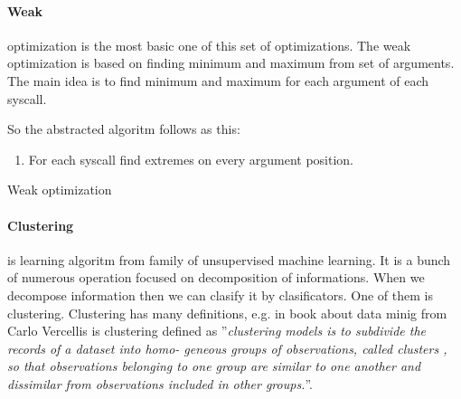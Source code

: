 	\paragraph{Weak}
	optimization is the most basic one of this set of optimizations.
	The weak optimization is based on finding minimum and maximum from set of arguments.
	The main idea is to find minimum and maximum for each argument of each syscall.

	So the abstracted algoritm follows as this:
	\begin{enumerate}
		\item For each syscall find extremes on every argument position.
	\end{enumerate}

	\begin{algorithm}[H]



		\caption{Weak optimization}\label{algo:weak}
	\end{algorithm}

	\paragraph{Clustering} is learning algoritm from family of unsupervised machine learning. It is
	a bunch of numerous operation focused on decomposition of informations.
	When we decompose information then we can clasify it by clasificators.
	One of them is clustering. Clustering has many definitions, e.g.
	 in book about data minig from Carlo Vercellis is clustering defined as
	''\emph{clustering models is to subdivide the records of a dataset into homo-
	geneous groups of observations, called clusters , so that observations belonging
	to one group are similar to one another and dissimilar from observations
	included in other groups.}''. \cite{doi:10.1002/9780470753866.ch12}

